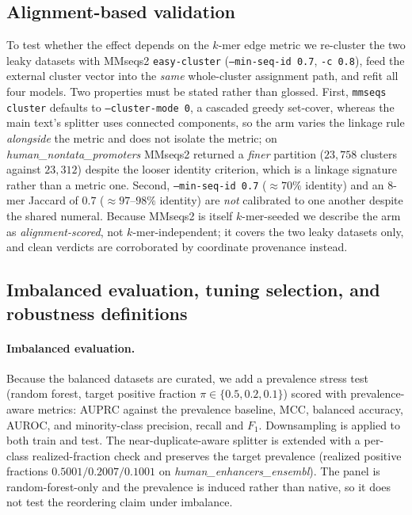 \documentclass[11pt,a4paper]{article}
\begin{document}
\subsection{Alignment-based validation}\label{sec:s-align}
To test whether the effect depends on the $k$-mer edge metric we re-cluster the two leaky datasets
with MMseqs2 \citep{steinegger2017mmseqs2} \texttt{easy-cluster} (\texttt{--min-seq-id 0.7},
\texttt{-c 0.8}), feed the external cluster vector into the \emph{same} whole-cluster assignment
path, and refit all four models. Two properties must be stated rather than glossed. First,
\texttt{mmseqs cluster} defaults to \texttt{--cluster-mode 0}, a cascaded greedy set-cover, whereas
the main text's splitter uses connected components, so the arm varies the linkage rule
\emph{alongside} the metric and does not isolate the metric; on
\textit{human\_nontata\_promoters} MMseqs2 returned a \emph{finer} partition ($23{,}758$ clusters
against $23{,}312$) despite the looser identity criterion, which is a linkage signature rather than
a metric one. Second, \texttt{--min-seq-id 0.7} (${\approx}70\%$ identity) and an $8$-mer Jaccard of
$0.7$ (${\approx}97$--$98\%$ identity) are \emph{not} calibrated to one another despite the shared
numeral. Because MMseqs2 is itself $k$-mer-seeded we describe the arm as \emph{alignment-scored},
not $k$-mer-independent; it covers the two leaky datasets only, and clean verdicts are corroborated
by coordinate provenance instead.

\subsection{Imbalanced evaluation, tuning selection, and robustness definitions}\label{sec:s-defs}
\paragraph{Imbalanced evaluation.} Because the balanced datasets are curated, we add a prevalence
stress test (random forest, target positive fraction $\pi\in\{0.5,0.2,0.1\}$) scored with
prevalence-aware metrics: AUPRC against the prevalence baseline, MCC, balanced accuracy, AUROC, and
minority-class precision, recall and $F_1$. Downsampling is applied to both train and test. The
near-duplicate-aware splitter is extended with a per-class realized-fraction check and preserves the
target prevalence (realized positive fractions $0.5001/0.2007/0.1001$ on
\textit{human\_enhancers\_ensembl}). The panel is random-forest-only and the prevalence is induced
rather than native, so it does not test the reordering claim under imbalance.
\end{document}
